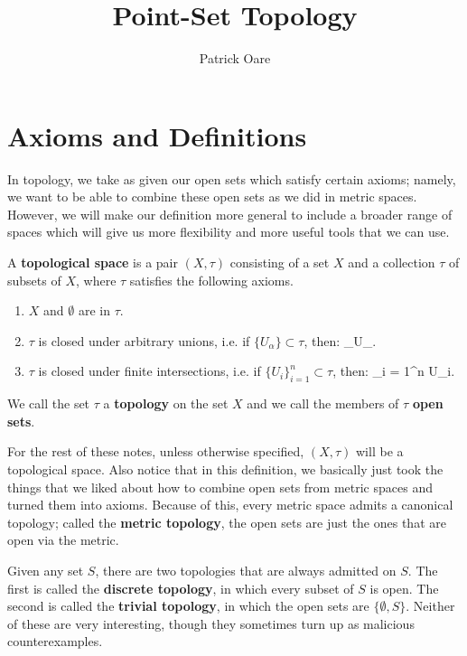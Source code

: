 \def \root {../../}			%


\title{Point-Set Topology}
\author{Patrick Oare}
\date{}							%


\maketitle

\section{Axioms and Definitions}

	In topology, we take as given our open sets which satisfy certain axioms; namely, we want to be able to combine these open sets as we did in metric 
	spaces. However, we will make our definition more general to include a broader range of spaces which will give us more flexibility and more useful 
	tools that we can use.
	
	\begin{definition} A \textbf{topological space} is a pair $(X, \tau)$ consisting of a set $X$ and a collection $\tau$ of subsets of $X$, where 
	$\tau$ satisfies the following axioms.
		\begin{enumerate}
			\item $X$ and $\emptyset$ are in $\tau$.
			\item $\tau$ is closed under arbitrary unions, i.e. if $\{U_\alpha\}\subset\tau$, then:
			\eq
				\bigcup_\alpha U_\alpha\in\tau.
			\qe
			\item $\tau$ is closed under finite intersections, i.e. if $\{U_i\}_{i = 1}^n\subset\tau$, then:
			\eq
				\bigcap_{i = 1}^n U_i\in\tau.
			\qe
		\end{enumerate}
	We call the set $\tau$ a \textbf{topology} on the set $X$ and we call the members of $\tau$ \textbf{open sets}. 
	\end{definition}
	
	For the rest of these notes, unless otherwise specified, $(X, \tau)$ will be a topological space. Also notice that in this definition, we basically just took the 
	things that we liked about how to combine open sets from metric spaces and turned them into axioms. Because of this, every metric space admits a 
	canonical topology; called the \textbf{metric topology}, the open sets are just the ones that are open via the metric. 
	
	Given any set $S$, there are two topologies that are always admitted on $S$. The first is called the \textbf{discrete topology}, in which every subset of $S$ 
	is open. The second is called the \textbf{trivial topology}, in which the open sets are $\{\emptyset, S\}$. Neither of these are very interesting, though they 
	sometimes turn up as malicious counterexamples.
	

